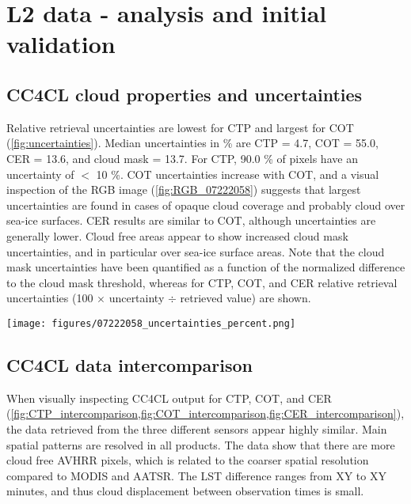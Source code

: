 \section{L2 data - analysis and initial validation}\label{L2_data}

\subsection{CC4CL cloud properties and uncertainties}

Relative retrieval uncertainties are lowest for CTP and largest for COT (\cref{fig:uncertainties}). Median uncertainties in \% are CTP = 4.7, COT = 55.0, CER = 13.6, and cloud mask = 13.7. For CTP, 90.0 \% of pixels have an uncertainty of $<$ 10 \%. COT uncertainties increase with COT, and a visual inspection of the RGB image (\cref{fig:RGB_07222058}) suggests that largest uncertainties are found in cases of opaque cloud coverage and probably cloud over sea-ice surfaces. CER results are similar to COT, although uncertainties are generally lower. Cloud free areas appear to show increased cloud mask uncertainties, and in particular over sea-ice surface areas. Note that the cloud mask uncertainties have been quantified as a function of the normalized difference to the cloud mask threshold, whereas for CTP, COT, and CER relative retrieval uncertainties (100 $\times$ uncertainty $\div$ retrieved value) are shown. 

\begin{figure*}[h]
  \texttt{[image: figures/07222058\_uncertainties\_percent.png]}
  \caption{Relative uncertainties [\%] of MODIS AQUA retrieval data for study area NA2 and CTP, COT, CER, and Cloud mask.}
  \label{fig:uncertainties}
\end{figure*}

\subsection{CC4CL data intercomparison}

When visually inspecting CC4CL output for CTP, COT, and CER (\cref{fig:CTP_intercomparison,fig:COT_intercomparison,fig:CER_intercomparison}), the data retrieved from the three different sensors appear highly similar. Main spatial patterns are resolved in all products. The data show that there are more cloud free AVHRR pixels, which is related to the coarser spatial resolution compared to MODIS and AATSR. The LST difference ranges from XY to XY minutes, and thus cloud displacement between observation times is small.


